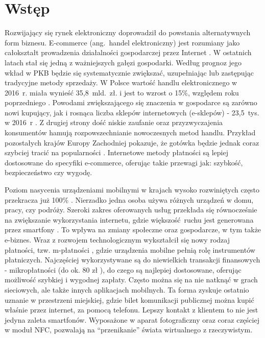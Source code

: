 \section*{Wstęp}

Rozwijający się rynek elektroniczny doprowadził do powstania alternatywnych form biznesu. E-commerce (ang.~handel elektroniczny) \cite{biblia_ebiznesu} jest rozumiany jako całokształt prowadzenia działalności gospodarczej przez Internet \cite{pieniadz_elektroniczny-analiza}. W ostatnich latach stał się jedną z ważniejszych gałęzi gospodarki. Według prognoz jego wkład w PKB będzie się systematycznie zwiększać, uzupełniając lub zastępując tradycyjne metody sprzedaży. W Polsce wartość handlu elektronicznego w 2016~r. miała wynieść 35,8~mld.~zł. i jest to wzrost o 15\%, względem roku poprzedniego \cite{barometr_radio}. Powodami zwiększającego się znaczenia w gospodarce są zarówno nowi kupujący, jak i rosnąca liczba sklepów internetowych (e-sklepów) - 23,5~tys. w 2016~r \cite{barometr_radio}. Z drugiej strony dość niskie zaufanie oraz przyzwyczajenia konsumentów hamują rozpowszechnianie nowoczesnych metod handlu. Przykład pozostałych krajów Europy Zachodniej pokazuje, że gotówka będzie jednak coraz szybciej tracić na popularności \cite{pieniadz_elektroniczny-analiza}. Internetowe metody płatności są lepiej dostosowane do specyfiki e-commerce, oferując takie przewagi jak: szybkość, bezpieczeństwo czy wygodę.

Poziom nasycenia urządzeniami mobilnymi w krajach wysoko rozwiniętych często przekracza już 100\% \cite{biblia_ebiznesu}. Nierzadko jedna osoba używa różnych urządzeń w domu, pracy, czy podróży. Szeroki zakres oferowanych usług przekłada się równocześnie na zwiększanie wykorzystania internetu, gdzie większość ruchu jest generowana przez smartfony \cite{ruch_mobilny-internet}. To wpływa na zmiany społeczne oraz gospodarcze, w tym także e-biznes. Wraz z rozwojem technologicznym wykształcił się nowy rodzaj płatności, tzw. m-płatności \cite{biblia_ebiznesu}, gdzie urządzenia mobilne pełnią rolę instrumentów płatniczych. Najczęściej wykorzystywane są do niewielkich transakcji finansowych - mikropłatności (do ok. 80 zł \cite{elektroniczne_metody_platnosci}), do czego są najlepiej dostosowane, oferując możliwość szybkiej i wygodnej zapłaty. Często można się na nie natknąć w grach sieciowych, ale także innych aplikacjach mobilnych. Ta forma zyskuje ostatnio uznanie w przestrzeni miejskiej, gdzie bilet komunikacji publicznej można kupić właśnie przez internet, za pomocą telefonu. Lepszy kontakt z klientem to nie jest jedyna zaleta smartfonów. Wyposażone w aparat fotograficzny oraz coraz częściej w moduł NFC, pozwalają na ``przenikanie'' świata wirtualnego z rzeczywistym. 

